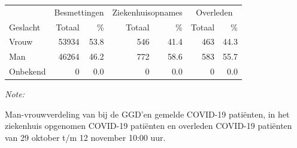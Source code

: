 \documentclass[
  english,
  man,floatsintext]{apa6}
\begin{document}
\begin{table}[H]
\centering\begingroup\fontsize{11}{13}\selectfont

\begin{threeparttable}
\begin{tabular}{lrrrrrr}
\toprule
\multicolumn{1}{c}{ } & \multicolumn{2}{c}{Besmettingen} & \multicolumn{2}{c}{Ziekenhuisopnames} & \multicolumn{2}{c}{Overleden} \\
\cmidrule(l{3pt}r{3pt}){2-3} \cmidrule(l{3pt}r{3pt}){4-5} \cmidrule(l{3pt}r{3pt}){6-7}
Geslacht & Totaal & \% & Totaal & \% & Totaal & \%\\
\midrule
Vrouw & 53934 & 53.8 & 546 & 41.4 & 463 & 44.3\\
Man & 46264 & 46.2 & 772 & 58.6 & 583 & 55.7\\
Onbekend & 0 & 0.0 & 0 & 0.0 & 0 & 0.0\\
\bottomrule
\end{tabular}
\begin{tablenotes}
\item \textit{Note: } 
\item Man-vrouwverdeling van bij de GGD’en gemelde COVID-19 patiënten, in het ziekenhuis opgenomen COVID-19 patiënten en overleden COVID-19 patiënten van 29 oktober t/m 12 november 10:00 uur.
\end{tablenotes}
\end{threeparttable}
\endgroup{}
\end{table}
\newpage
\end{document}
